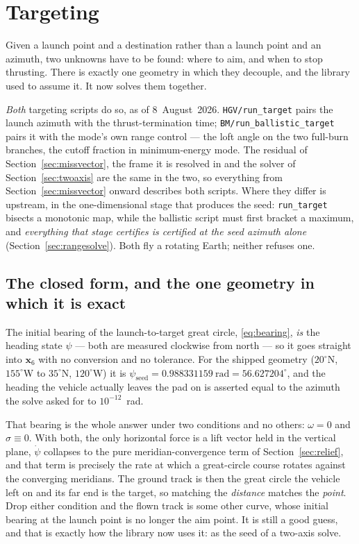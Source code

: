 \documentclass[11pt]{article}
\newcommand{\code}[1]{\texttt{#1}}
\begin{document}
\section{Targeting}
\label{sec:targeting}

Given a launch point and a destination rather than a launch point and an
azimuth, two unknowns have to be found: where to aim, and when to stop
thrusting. There is exactly one geometry in which they decouple, and the
library used to assume it. It now solves them together.

\emph{Both} targeting scripts do so, as of 8~August~2026.
\code{HGV/run\_target} pairs the launch azimuth with the thrust-termination
time; \code{BM/run\_ballistic\_target} pairs it with the mode's own range
control --- the loft angle on the two full-burn branches, the cutoff fraction
in minimum-energy mode. The residual of Section~\ref{sec:missvector}, the frame
it is resolved in and the solver of Section~\ref{sec:twoaxis} are the same in
the two, so everything from Section~\ref{sec:missvector} onward describes both
scripts. Where they differ is upstream, in the one-dimensional stage that
produces the seed: \code{run\_target} bisects a monotonic map, while the
ballistic script must first bracket a maximum, and \emph{everything that stage
certifies is certified at the seed azimuth alone}
(Section~\ref{sec:rangesolve}). Both fly a rotating Earth; neither refuses one.

\subsection{The closed form, and the one geometry in which it is exact}
\label{sec:aimseed}

The initial bearing of the launch-to-target great circle, \eqref{eq:bearing},
\emph{is} the heading state $\psi$ --- both are measured clockwise from north
--- so it goes straight into $\mathbf{x}_6$ with no conversion and no
tolerance. For the shipped geometry ($20^{\circ}$N, $155^{\circ}$W to
$35^{\circ}$N, $120^{\circ}$W) it is
$\psi_{\text{seed}} = 0.988331159~\mathrm{rad} = 56.627204^{\circ}$, and the
heading the vehicle actually leaves the pad on is asserted equal to the azimuth
the solve asked for to $10^{-12}$~rad.

That bearing is the whole answer under two conditions and no others:
$\omega = 0$ and $\sigma\equiv 0$. With both, the only horizontal force is a
lift vector held in the vertical plane, $\dot\psi$ collapses to the pure
meridian-convergence term of Section~\ref{sec:relief}, and that term is
precisely the rate at which a great-circle course rotates against the
converging meridians. The ground track is then the great circle the vehicle
left on and its far end is the target, so matching the \emph{distance} matches
the \emph{point}. Drop either condition and the flown track is some other
curve, whose initial bearing at the launch point is no longer the aim point.
It is still a good guess, and that is exactly how the library now uses it: as
the seed of a two-axis solve.
\end{document}
